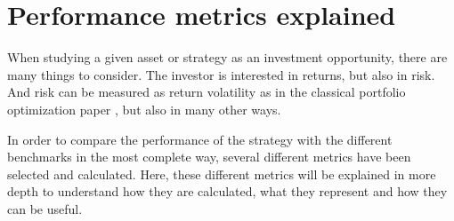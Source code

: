 \section{Performance metrics explained}
\label{sec:performance-metrics-explained}
When studying a given asset or strategy as an investment opportunity, there are many things to consider. The investor is interested in returns, but also in risk. And risk can be measured as return volatility as in the classical portfolio optimization paper \cite{markowitz_1952}, but also in many other ways. 

In order to compare the performance of the strategy with the different benchmarks in the most complete way, several different metrics have been selected and calculated. Here, these different metrics will be explained in more depth to understand how they are calculated, what they represent and how they can be useful. 


